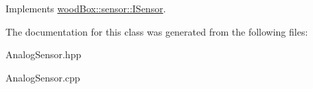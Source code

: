 Implements \mbox{\hyperlink{classwood_box_1_1sensor_1_1_i_sensor_a9de8041b991b76cc2f6fcc3b6a1bf363}{wood\+Box\+::sensor\+::\+I\+Sensor}}.



The documentation for this class was generated from the following files\+:\begin{DoxyCompactItemize}
\item 
Analog\+Sensor.\+hpp\item 
Analog\+Sensor.\+cpp\end{DoxyCompactItemize}
